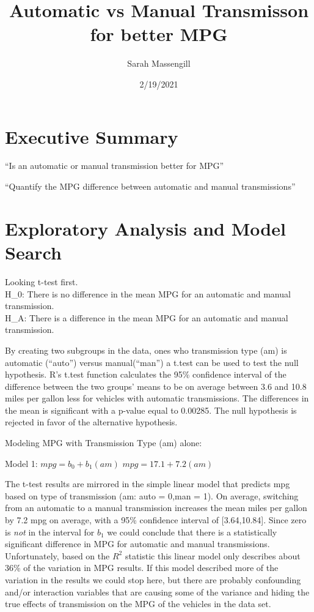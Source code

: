 \documentclass[
]{article}
\title{Automatic vs Manual Transmisson for better MPG}
\author{Sarah Massengill}
\date{2/19/2021}
\begin{document}
\maketitle

\hypertarget{executive-summary}{%
\section{Executive Summary}\label{executive-summary}}

``Is an automatic or manual transmission better for MPG''

``Quantify the MPG difference between automatic and manual
transmissions''

\hypertarget{exploratory-analysis-and-model-search}{%
\section{Exploratory Analysis and Model
Search}\label{exploratory-analysis-and-model-search}}

Looking t-test first.\\
H\_0: There is no difference in the mean MPG for an automatic and manual
transmission.\\
H\_A: There is a difference in the mean MPG for an automatic and manual
transmission.

By creating two subgroups in the data, ones who transmission type (am)
is automatic (``auto'') versus manual(``man'') a t.test can be used to
test the null hypothesis. R's t.test function calculates the 95\%
confidence interval of the difference between the two groups' means to
be on average between 3.6 and 10.8 miles per gallon less for vehicles
with automatic transmissions. The differences in the mean is significant
with a p-value equal to 0.00285. The null hypothesis is rejected in
favor of the alternative hypothesis.

Modeling MPG with Transmission Type (am) alone:

Model 1: \(mpg = b_0 + b_1(am)\) \(mpg = 17.1 + 7.2(am)\)

The t-test results are mirrored in the simple linear model that predicts
mpg based on type of transmission (am: auto = 0,man = 1). On average,
switching from an automatic to a manual transmission increases the mean
miles per gallon by 7.2 mpg on average, with a 95\% confidence interval
of {[}3.64,10.84{]}. Since zero is \emph{not} in the interval for
\(b_1\) we could conclude that there is a statistically significant
difference in MPG for automatic and manual transmissions. Unfortunately,
based on the \(R^2\) statistic this linear model only describes about
36\% of the variation in MPG results. If this model described more of
the variation in the results we could stop here, but there are probably
confounding and/or interaction variables that are causing some of the
variance and hiding the true effects of transmission on the MPG of the
vehicles in the data set.
\end{document}
